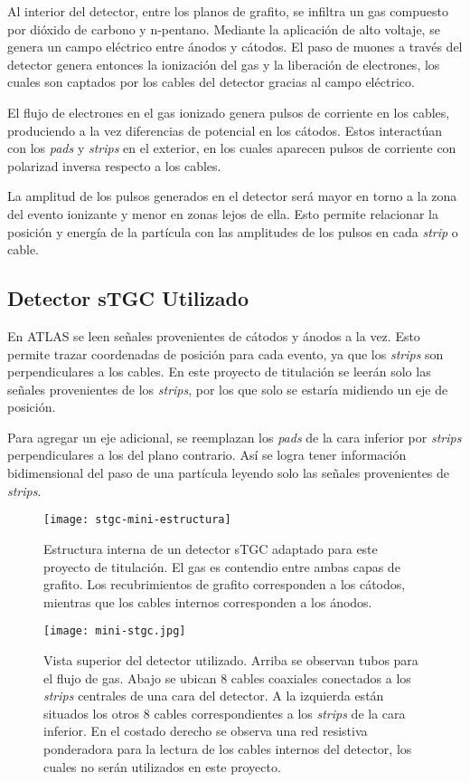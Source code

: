 	Al interior del detector, entre los planos de grafito, se infiltra un gas compuesto por dióxido de carbono y n-pentano. Mediante la aplicación de alto voltaje, se genera un campo eléctrico entre ánodos y cátodos. El paso de muones a través del detector genera entonces la ionización del gas y la liberación de electrones, los cuales son captados por los cables del detector gracias al campo eléctrico.
	
	El flujo de electrones en el gas ionizado genera pulsos de corriente en los cables, produciendo a la vez diferencias de potencial en los cátodos. Estos interactúan con los \textit{pads} y \textit{strips} en el exterior, en los cuales aparecen pulsos de corriente con polarizad inversa respecto a los cables.
	
	La amplitud de los pulsos generados en el detector será mayor en torno a la zona del evento ionizante y menor en zonas lejos de ella. Esto permite relacionar la posición y energía de la partícula con las amplitudes de los pulsos en cada \textit{strip} o cable.

\subsection*{Detector sTGC Utilizado}
	En ATLAS se leen señales provenientes de cátodos y ánodos a la vez. Esto permite trazar coordenadas de posición para cada evento, ya que los \textit{strips} son perpendiculares a los cables. En este proyecto de titulación se leerán solo las señales provenientes de los \textit{strips}, por los que solo se estaría midiendo un eje de posición. 
	
	Para agregar un eje adicional, se reemplazan los \textit{pads} de la cara inferior por \textit{strips} perpendiculares a los del plano contrario. Así se logra tener información bidimensional del paso de una partícula leyendo solo las señales provenientes de \textit{strips}.
	
	\begin{figure}
		\centering
		\texttt{[image: stgc-mini-estructura]}
		\caption{Estructura interna de un detector sTGC adaptado para este proyecto de titulación. El gas es contendio entre ambas capas de grafito. Los recubrimientos de grafito corresponden a los cátodos, mientras que los cables internos corresponden a los ánodos.}
		\label{img:stgc-mini-estructura}
	\end{figure}
	
	
	\begin{figure}
		\centering
		\texttt{[image: mini-stgc.jpg]}
		\caption{Vista superior del detector utilizado. Arriba se observan tubos para el flujo de gas. Abajo se ubican 8 cables coaxiales conectados a los \textit{strips} centrales de una cara del detector. A la izquierda están situados los otros 8 cables correspondientes a los \textit{strips} de la cara inferior. En el costado derecho se observa una red resistiva ponderadora para la lectura de los cables internos del detector, los cuales no serán utilizados en este proyecto.}
		\label{img:foto-mini-stgc}
	\end{figure}
	
